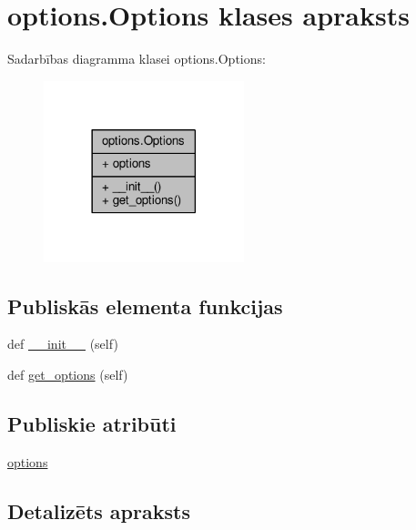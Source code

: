 \hypertarget{classoptions_1_1_options}{}\section{options.\+Options klases apraksts}
\label{classoptions_1_1_options}


Sadarbības diagramma klasei options.\+Options\+:
\nopagebreak
\begin{figure}[H]
\begin{center}
\leavevmode
\includegraphics[width=165pt]{classoptions_1_1_options__coll__graph}
\end{center}
\end{figure}
\subsection*{Publiskās elementa funkcijas}
\begin{DoxyCompactItemize}
\item 
def \hyperlink{classoptions_1_1_options_ad708dd8dd3879087314e2e86c0fad701}{\+\_\+\+\_\+init\+\_\+\+\_\+} (self)
\item 
def \hyperlink{classoptions_1_1_options_a165cc2bdb7015d5f0333fdc463cfaf67}{get\+\_\+options} (self)
\end{DoxyCompactItemize}
\subsection*{Publiskie atribūti}
\begin{DoxyCompactItemize}
\item 
\hyperlink{classoptions_1_1_options_a9c41aa8b6baa3a4f7cf9817d2aea2fa1}{options}
\end{DoxyCompactItemize}


\subsection{Detalizēts apraksts}



